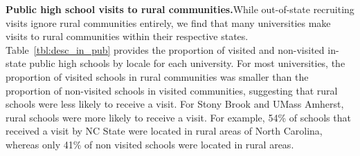 \documentclass[twoside]{article}
\begin{document}
\textbf{Public high school visits to rural communities.}While out-of-state recruiting visits ignore rural communities entirely, we find that many universities make visits to rural communities within their respective states. Table~\ref{tbl:desc_in_pub} provides the proportion of visited and non-visited in-state public high schools by locale for each university. For most universities, the proportion of visited schools in rural communities was smaller than the proportion of non-visited schools in visited communities, suggesting that rural schools were less likely to receive a visit.  For Stony Brook and UMass Amherst, rural schools were more likely to receive a visit. For example, 54\% of schools that received a visit by NC State were located in rural areas of North Carolina, whereas only 41\% of non visited schools were located in rural areas.


\end{document}
